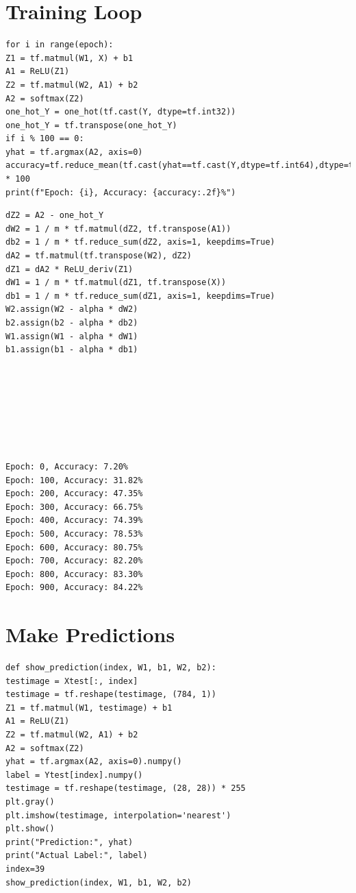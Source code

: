 \section{Training Loop}
\vspace{-.6cm}
\begin{code}
\begin{lstlisting}
for i in range(epoch):
Z1 = tf.matmul(W1, X) + b1
A1 = ReLU(Z1)
Z2 = tf.matmul(W2, A1) + b2
A2 = softmax(Z2)
one_hot_Y = one_hot(tf.cast(Y, dtype=tf.int32))
one_hot_Y = tf.transpose(one_hot_Y)
if i % 100 == 0:
yhat = tf.argmax(A2, axis=0)
accuracy=tf.reduce_mean(tf.cast(yhat==tf.cast(Y,dtype=tf.int64),dtype=tf.float32)).numpy() * 100
print(f"Epoch: {i}, Accuracy: {accuracy:.2f}%")
\end{lstlisting}
\end{code}
\begin{code}
\begin{lstlisting}
dZ2 = A2 - one_hot_Y
dW2 = 1 / m * tf.matmul(dZ2, tf.transpose(A1))
db2 = 1 / m * tf.reduce_sum(dZ2, axis=1, keepdims=True)
dA2 = tf.matmul(tf.transpose(W2), dZ2)
dZ1 = dA2 * ReLU_deriv(Z1)
dW1 = 1 / m * tf.matmul(dZ1, tf.transpose(X))
db1 = 1 / m * tf.reduce_sum(dZ1, axis=1, keepdims=True)
W2.assign(W2 - alpha * dW2)
b2.assign(b2 - alpha * db2)
W1.assign(W1 - alpha * dW1)
b1.assign(b1 - alpha * db1)
\end{lstlisting}
\end{code}
\vspace{-1cm}
\begin{verbatim}







Epoch: 0, Accuracy: 7.20%
Epoch: 100, Accuracy: 31.82%
Epoch: 200, Accuracy: 47.35%
Epoch: 300, Accuracy: 66.75%
Epoch: 400, Accuracy: 74.39%
Epoch: 500, Accuracy: 78.53%
Epoch: 600, Accuracy: 80.75%
Epoch: 700, Accuracy: 82.20%
Epoch: 800, Accuracy: 83.30%
Epoch: 900, Accuracy: 84.22%
\end{verbatim}
\section{Make Predictions}
\begin{lstlisting}
def show_prediction(index, W1, b1, W2, b2):
testimage = Xtest[:, index]
testimage = tf.reshape(testimage, (784, 1))
Z1 = tf.matmul(W1, testimage) + b1
A1 = ReLU(Z1)
Z2 = tf.matmul(W2, A1) + b2
A2 = softmax(Z2)
yhat = tf.argmax(A2, axis=0).numpy()
label = Ytest[index].numpy()
testimage = tf.reshape(testimage, (28, 28)) * 255
plt.gray()
plt.imshow(testimage, interpolation='nearest')
plt.show()
print("Prediction:", yhat)
print("Actual Label:", label)
index=39
show_prediction(index, W1, b1, W2, b2)
\end{lstlisting}


